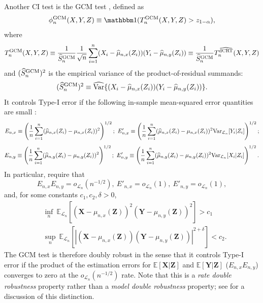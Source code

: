 \documentclass[aos]{imsart}
\theoremstyle{plain}
\theoremstyle{remark}
\newcommand{\E}{\mathbb E}								%
\newcommand{\V}{\mathrm{Var}}							%
\newcommand{\indicator}{\mathbbm 1}						%
\newcommand{\prx}{\bm X}								%
\newcommand{\srx}{X}									%
\newcommand{\prz}{\bm Z}								%
\newcommand{\srz}{Z}									%
\newcommand{\pry}{{\bm Y}}								%
\newcommand{\sry}{Y}									%
\newcommand{\law}{\mathcal L}							%
\newcommand{\GCM}{\textnormal{GCM}}						%
\newcommand{\dCRThat}{\widehat{\textnormal{dCRT}}}		%
\begin{document}
Another CI test is the GCM test \citep{Shah2018}, defined as
\begin{equation}
    \phi_n^{\GCM}(\srx, \sry, \srz) \equiv \indicator(T_n^{\GCM}(\srx, \sry, \srz) > z_{1-\alpha}),
    \label{eq:gcm-test}
\end{equation}
where
\begin{equation}
    T_n^{\GCM}(\srx, \sry, \srz) \equiv \frac{1}{\widehat S_{n}^{\GCM}}\frac{1}{\sqrt{n}}\sum_{i = 1}^n (\srx_i - \widehat \mu_{n,x}(\srz_i))(\sry_i - \widehat \mu_{n,y}(\srz_i)) \equiv \frac{1}{\widehat S_{n}^{\GCM}}T_n^{\dCRThat}(\srx, \sry, \srz)
\end{equation}
and $(\widehat S_{n}^{\GCM})^2$ is the empirical variance of the product-of-residual summands:
\begin{equation}
    (\widehat S_{n}^{\GCM})^2 \equiv \widehat{\V}\{(\srx_i - \widehat \mu_{n,x}(\srz_i))(\sry_i - \widehat \mu_{n,y}(\srz_i))\}.
\end{equation}
It controls Type-I error if the following in-sample mean-squared error quantities are small \citep{Shah2018}:
\small
\begin{equation*}
    E_{n, x} \equiv \left(\frac{1}{n}\sum_{i = 1}^n (\widehat \mu_{n,x}(\srz_i) -  \mu_{n,x}(\srz_i))^2\right)^{1/2};\ E'_{n, x} \equiv \left(\frac{1}{n}\sum_{i = 1}^n (\widehat \mu_{n,x}(\srz_i) -  \mu_{n,x}(\srz_i))^2\textnormal{Var}_{\law_n}[\sry_i|\srz_i]\right)^{1/2};
\end{equation*}	
\begin{equation*}
    E_{n, y} \equiv \left(\frac{1}{n}\sum_{i = 1}^n (\widehat \mu_{n,y}(\srz_i) -  \mu_{n,y}(\srz_i))^2\right)^{1/2};\ E'_{n, y} \equiv \left(\frac{1}{n}\sum_{i = 1}^n (\widehat \mu_{n,y}(\srz_i) -  \mu_{n,y}(\srz_i))^2\textnormal{Var}_{\law_n}[\srx_i|\srz_i]\right)^{1/2}.
\end{equation*}
\normalsize
In particular, \citet{Shah2018} require that
\begin{equation}
    E_{n, x} E_{n, y}  = o_{\law_n}(n^{-1/2}),\  E'_{n, x} = o_{\law_n}(1),\  E'_{n, y} = o_{\law_n}(1)
    \label{eq:sp1}, \tag{SP1}
\end{equation}
and, for some constants $c_1, c_2, \delta > 0$,
\begin{equation}
    \begin{split}
        &\inf_n\ \E_{\law_n}[(\prx-\mu_{n,x}(\prz))^2(\pry-\mu_{n,y}(\prz))^2] > c_1\\
        &\sup_n\ \E_{\law_n}[|(\prx-\mu_{n,x}(\prz))(\pry-\mu_{n,y}(\prz))|^{2+\delta}] < c_2.
        \label{eq:sp2}
    \end{split}
    \tag{SP2}
\end{equation}
The GCM test is therefore doubly robust in the sense that it controls Type-I error if the product of the estimation errors for $\E[\prx|\prz]$ and $\E[\pry|\prz]$ ($E_{n,x}E_{n,y}$) converges to zero at the $o_{\law_n}(n^{-1/2})$ rate. Note that this is a \textit{rate double robustness} property rather than a \textit{model double robustness} property; see \citet{Smucler2019} for a discussion of this distinction.
\end{document}
